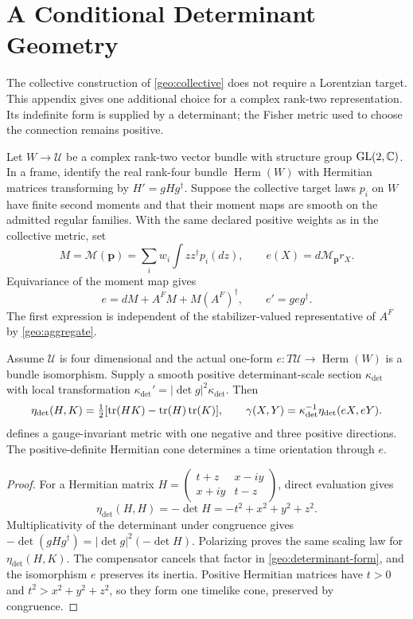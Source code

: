 \chapter{A Conditional Determinant Geometry}
\label{app:determinant}

The collective construction of \cref{geo:collective} does not require a Lorentzian target. This appendix gives one additional choice for a complex rank-two representation. Its indefinite form is supplied by a determinant; the Fisher metric used to choose the connection remains positive.

Let $W\to\mathcal U$ be a complex rank-two vector bundle with structure group $\mathrm{GL}(2,\mathbb C)$. In a frame, identify the real rank-four bundle $\operatorname{Herm}(W)$ with Hermitian matrices transforming by $H'=gHg^\dagger$. Suppose the collective target laws $p_i$ on $W$ have finite second moments and that their moment maps are smooth on the admitted regular families. With the same declared positive weights as in the collective metric, set
\begin{equation}
M=\mathcal M(\boldsymbol p)=\sum_iw_i\int zz^\dagger p_i(dz),
\qquad
e(X)=d\mathcal M_{\boldsymbol p}r_X.
\label{geo:det-moment}
\end{equation}
Equivariance of the moment map gives
\begin{equation}
e=dM+A^F M+M(A^F)^\dagger,
\qquad e'=g e g^\dagger.
\end{equation}
The first expression is independent of the stabilizer-valued representative of $A^F$ by \cref{geo:aggregate}.

Assume $\mathcal U$ is four dimensional and the actual one-form $e:T\mathcal U\to\operatorname{Herm}(W)$ is a bundle isomorphism. Supply a smooth positive determinant-scale section $\kappa_{\det}$ with local transformation
$\kappa_{\det}'=|\det g|^2\kappa_{\det}$. Then
\begin{equation}
\eta_{\det}(H,K)
=\tfrac12[\operatorname{tr}(HK)-\operatorname{tr}(H)\operatorname{tr}(K)],
\qquad
\gamma(X,Y)=\kappa_{\det}^{-1}\eta_{\det}(eX,eY).
\label{geo:determinant-form}
\end{equation}
defines a gauge-invariant metric with one negative and three positive directions. The positive-definite Hermitian cone determines a time orientation through $e$.
\begin{proof}
For a Hermitian matrix
$H=\begin{pmatrix}t+z&x-iy\\x+iy&t-z\end{pmatrix}$,
direct evaluation gives
\begin{equation}
\eta_{\det}(H,H)=-\det H=-t^2+x^2+y^2+z^2.
\end{equation}
Multiplicativity of the determinant under congruence gives
$-\det(gHg^\dagger)=|\det g|^2(-\det H)$. Polarizing proves the same scaling law for $\eta_{\det}(H,K)$. The compensator cancels that factor in \cref{geo:determinant-form}, and the isomorphism $e$ preserves its inertia. Positive Hermitian matrices have $t>0$ and $t^2>x^2+y^2+z^2$, so they form one timelike cone, preserved by congruence.
\end{proof}

